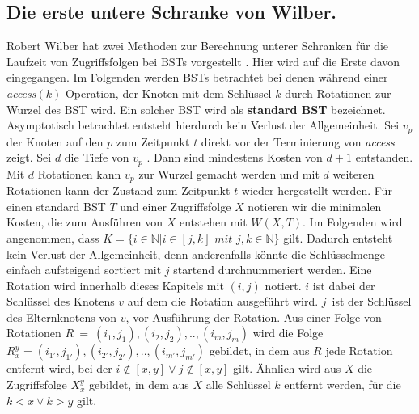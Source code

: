 \documentclass[a4paper,12pt]{article}
\begin{document}
\subsection{Die erste untere Schranke von Wilber.} \label{wilberBound}
Robert Wilber hat zwei Methoden zur Berechnung unterer Schranken für die Laufzeit von Zugriffsfolgen bei BSTs vorgestellt \cite{wilberLowerBounds}. Hier wird auf die Erste davon eingegangen. Im Folgenden werden BSTs betrachtet bei denen während einer \textit{access$(k)$} Operation, der Knoten mit dem Schlüssel $k$ durch Rotationen zur Wurzel des BST wird. Ein solcher BST wird als \textbf{standard BST} bezeichnet. Asymptotisch betrachtet entsteht hierdurch kein Verlust der Allgemeinheit. Sei $v_p$ der Knoten auf den $p$ zum Zeitpunkt $t$ direkt vor der Terminierung von \textit{access} zeigt. Sei $d$ die Tiefe von $v_p$ . Dann sind mindestens Kosten von $d + 1$ entstanden. Mit $d$ Rotationen kann $v_p$ zur Wurzel gemacht werden und mit $d$ weiteren Rotationen kann der Zustand zum Zeitpunkt $t$ wieder hergestellt werden.
Für einen standard BST $T$ und einer Zugriffsfolge $X$ notieren wir die minimalen Kosten, die zum Ausführen von $X$ entstehen mit $W(X, T)$. Im Folgenden wird angenommen, dass 
$K = \{  i \in \mathbb{N} \vert i \in \left[j,k\right] \textit{ mit } j,k \in  \mathbb{N} \} $ gilt. Dadurch entsteht kein Verlust der Allgemeinheit, denn anderenfalls könnte die Schlüsselmenge einfach aufsteigend sortiert mit $j$ startend durchnummeriert werden. Eine Rotation wird innerhalb dieses Kapitels mit $\left(i, j\right)$ notiert. $i$ ist dabei der Schlüssel des Knotens $v$ auf dem die Rotation ausgeführt wird. $j$~ist der Schlüssel des Elternknotens von $v$, vor Ausführung der Rotation. Aus einer Folge von Rotationen $R~=~\left(i_1,j_1 \right),\left(i_2,j_2 \right),..,\left(i_m,j_m \right)$ wird die Folge  $R^y_x = \left(i_{1'},j_{1'}\right),\left(i_{2'},j_{2'} \right),..,\left(i_{m'},j_{m'} \right)$ gebildet, in dem aus $R$ jede Rotation entfernt wird, bei der $i\notin \left[x,y\right] \lor j\notin \left[x,y\right]$ gilt. Ähnlich wird aus $X$ die Zugriffsfolge $X^y_x$ gebildet, in dem aus $X$ alle Schlüssel $k$ entfernt werden, für die $k < x  \lor k > y$ gilt.
\end{document}
